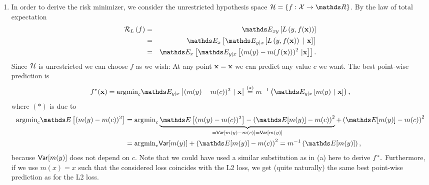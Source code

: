 \documentclass[a4paper]{article}
\begin{document}
{\begin{enumerate}
%
So, combining the three later math displays, we obtain
%
\begin{align*}
	\risk_L\left(\fh \right) 
	&=   \E_{xy} \left[    m(y)^2  \right]  - 2 \E_{xy} \left[    m(y)   \frac1n \sum_{i=1}^n m(\yi)  \right]  +    \E_{xy} \left[ \frac1n \sum_{i=1}^n m(\yi)    \right]  \\
	&=  \E_{xy} \left[    m(y)^2  \right]  - 2 \E_{xy} \left[  m(y) \right]^2 + \frac1n	\E_{xy} \left[   m(y)^2  \right] +   (1-\frac1n) \E_{xy} \left[  m(y)   \right]^2 \\
%	
	&= \left( 1 + \frac1n \right) \left(   \E_{xy} \left[    m(y)^2  \right]  -  \E_{xy} \left[    m(y)  \right] ^2			\right) \\
%	
	&= \left( 1 + \frac1n \right) \var(m(y)).
\end{align*}
% 
\item In order to derive the risk minimizer, we consider the unrestricted hypothesis space $\Hspace = \{f: \Xspace \to \R\}$. 
%
	By the law of total expectation
		\begin{eqnarray*}
			\risk_L\left(f \right)  &=& \E_{xy} \left[\Lxy\right] 
			\\ &=& \E_x \left[\E_{y|x}\left[\Lxy~|~\xv\right]\right] \\
			&=& \E_x
			\left[\E_{y|x}\left[(m(y)- m(\fx))^2~|\xv\right]\right]. 
		\end{eqnarray*} 
	Since $\mathcal{H}$ is unrestricted we can choose $f$ as we wish: At any point $\mathbf{x} = \mathbf{x}$ we can predict any value $c$ we want. The best point-wise prediction is 
	$$
	\fxbayes = \mbox{argmin}_c \E_{y|x}\left[( m(y) - m(c) )^2 ~|~ \xv  \right]\overset{(*)}{=} m^{-1} \left(  \E_{y|x}\left[ m(y) ~|~ \xv \right] \right),
	$$
%	
	where $(*)$ is due to 
%	
	\begin{align*}
%		
		\mbox{argmin}_c \E\left[(m(y) - m(c))^2\right] 
%		
		&= \mbox{argmin}_c \underbrace{\E\left[( m(y) - m(c) )^2\right] - \left(\E[ m(y)] - m(c) \right)^2}_{= \var[ m(y) - m(c)] = \var[m(y)]} + \left(\E[m(y)] - m(c)\right)^2 \\
%		
		&=   \mbox{argmin}_c \var[m(y)] + \left(\E[m(y)] - m(c)\right)^2 
%		
		= m^{-1} \left( \E[m(y)]\right) , 
%		
	\end{align*}
	because $\mathsf{Var}[m(y)] $ does not depend on $c.$
% 
Note that we could have used a similar substitution as in (a) here to derive $f^{\ast}.$
%
Furthermore, if we use $m(x)=x$ such that the considered loss coincides with the L2 loss, we get (quite naturally) the same best point-wise prediction as for the L2 loss. 

\end{enumerate}}
\end{document}

